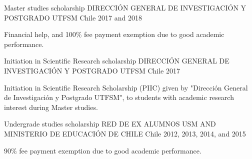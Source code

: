 

\begin{cventries}
\cventry
    {Master studies scholarship} %
    {DIRECCIÓN GENERAL DE INVESTIGACIÓN Y POSTGRADO UTFSM} %
    {Chile}
    {2017 and 2018} %
    {
        \begin{cvitems}
        \item {Financial help, and 100\% fee payment exemption due to good academic performance.}
        \end{cvitems}
    }

\cventry
    {Initiation in Scientific Research scholarship} %
    {DIRECCIÓN GENERAL DE INVESTIGACIÓN Y POSTGRADO UTFSM} %
    {Chile}
    {2017} %
    {
        \begin{cvitems}
        \item     {Initiation in Scientific Research Scholarship (PIIC) given by "Dirección General de Investigación y Postgrado UTFSM", to students with academic research interest during Master studies.}
        \end{cvitems}
    }


\cventry
    {Undergrade studies scholarship} %
    {RED DE EX ALUMNOS USM AND MINISTERIO DE EDUCACIÓN DE CHILE} %
    {Chile}
    {2012, 2013, 2014, and 2015} %
    {
        \begin{cvitems}
        \item     {90\% fee payment exemption due to good academic performance.} %
        \end{cvitems}
    }


\end{cventries}
